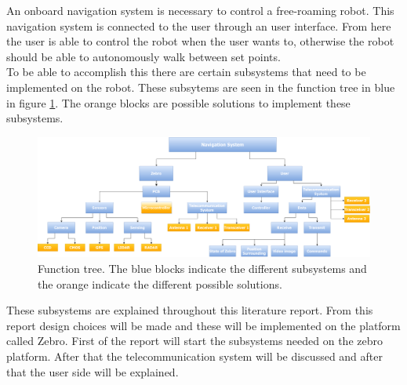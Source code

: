 \documentclass{article}
\begin{document}
An onboard navigation system is necessary to control a free-roaming robot. This navigation system is connected to the user through an user interface. From here the user is able to control the robot when the user wants to, otherwise the robot should be able to autonomously walk between set points.\\
To be able to accomplish this there are certain subsystems that need to be implemented on the robot. These subsytems are seen in the function tree in blue in figure \ref{intro1}. The orange blocks are possible solutions to implement these subsystems.

\begin{figure}[H]
	\centering
	\includegraphics[scale=0.27]{figures/functiontree}
	\caption{Function tree. The blue blocks indicate the different subsystems and the orange indicate the different possible solutions. }
	\label{intro1}
\end{figure}

These subsystems are explained throughout this literature report. From this report design choices will be made and these will be implemented on the platform called Zebro. First of the report will start the subsystems needed on the zebro platform. After that the telecommunication system will be discussed and after that the user side will be explained.
\end{document}

